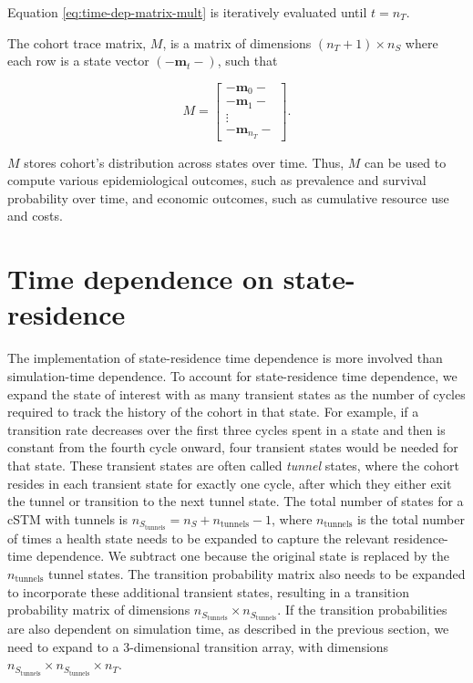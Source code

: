 \documentclass[
]{article}
\begin{document}
Equation \eqref{eq:time-dep-matrix-mult} is iteratively evaluated until \(t = n_T\).

The cohort trace matrix, \(M\), is a matrix of dimensions \((n_T+1) \times n_S\) where each row is a state vector \((-\mathbf{m}_{t}-)\), such that

\[
  M = 
  \begin{bmatrix}
    - \mathbf{m}_0 -  \\
    - \mathbf{m}_1 -  \\
     \vdots \\
    - \mathbf{m}_{n_T} -  
  \end{bmatrix}. 
\]

\(M\) stores cohort's distribution across states over time. Thus, \(M\) can be used to compute various epidemiological outcomes, such as prevalence and survival probability over time, and economic outcomes, such as cumulative resource use and costs.

\hypertarget{time-dependence-on-state-residence}{%
\section{Time dependence on state-residence}\label{time-dependence-on-state-residence}}

The implementation of state-residence time dependence is more involved than simulation-time dependence. To account for state-residence time dependence, we expand the state of interest with as many transient states as the number of cycles required to track the history of the cohort in that state. For example, if a transition rate decreases over the first three cycles spent in a state and then is constant from the fourth cycle onward, four transient states would be needed for that state. These transient states are often called \emph{tunnel} states, where the cohort resides in each transient state for exactly one cycle, after which they either exit the tunnel or transition to the next tunnel state. The total number of states for a cSTM with tunnels is \(n_{S_\text{tunnels}} = n_S + n_{\text{tunnels}} - 1\), where \(n_{\text{tunnels}}\) is the total number of times a health state needs to be expanded to capture the relevant residence-time dependence. We subtract one because the original state is replaced by the \(n_{\text{tunnels}}\) tunnel states. The transition probability matrix also needs to be expanded to incorporate these additional transient states, resulting in a transition probability matrix of dimensions \(n_{S_\text{tunnels}} \times n_{S_\text{tunnels}}\). If the transition probabilities are also dependent on simulation time, as described in the previous section, we need to expand to a 3-dimensional transition array, with dimensions \(n_{S_\text{tunnels}} \times n_{S_\text{tunnels}} \times n_T\).
\end{document}
